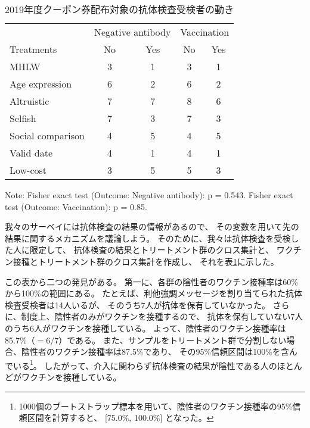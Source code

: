 \documentclass[
  11pt,
  a4paper,
]{article}
\begin{document}
\begin{table}

\caption{\label{tab:show-tester-coupon1}2019年度クーポン券配布対象の抗体検査受検者の動き}
\centering
\begin{threeparttable}
\begin{tabular}[t]{lcccc}
\toprule
\multicolumn{1}{c}{ } & \multicolumn{2}{c}{Negative antibody} & \multicolumn{2}{c}{Vaccination} \\
\cmidrule(l{3pt}r{3pt}){2-3} \cmidrule(l{3pt}r{3pt}){4-5}
Treatments & No & Yes & No  & Yes \\
\midrule
MHLW & 3 & 1 & 3 & 1\\
Age expression & 6 & 2 & 6 & 2\\
Altruistic & 7 & 7 & 8 & 6\\
Selfish & 7 & 3 & 7 & 3\\
Social comparison & 4 & 5 & 4 & 5\\
Valid date & 4 & 1 & 4 & 1\\
Low-cost & 3 & 5 & 5 & 3\\
\bottomrule
\end{tabular}
\begin{tablenotes}
\item Note: Fisher exact test (Outcome: Negative antibody): p = 0.543. Fisher exact test (Outcome: Vaccination): p = 0.85.
\end{tablenotes}
\end{threeparttable}
\end{table}

我々のサーベイには抗体検査の結果の情報があるので、
その変数を用いて先の結果に関するメカニズムを議論しよう。
そのために、我々は抗体検査を受検した人に限定して、
抗体検査の結果とトリートメント群のクロス集計と、
ワクチン接種とトリートメント群のクロス集計を作成し、
それを表\ref{tab:show-tester-coupon1}に示した。

この表から二つの発見がある。
第一に、各群の陰性者のワクチン接種率は60\%から100\%の範囲にある。
たとえば、利他強調メッセージを割り当てられた抗体検査受検者は14人いるが、
そのうち7人が抗体を保有していなかった。
さらに、制度上、陰性者のみがワクチンを接種するので、
抗体を保有していない7人のうち6人がワクチンを接種している。
よって、陰性者のワクチン接種率は85.7\%（\(=6/7\)）である。
また、サンプルをトリートメント群で分割しない場合、陰性者のワクチン接種率は87.5\%であり、
その95\%信頼区間は100\%を含んでいる\footnote{1000個のブートストラップ標本を用いて、陰性者のワクチン接種率の95\%信頼区間を計算すると、
  {[}75.0\%, 100.0\%{]}
  となった。}。
したがって、介入に関わらず抗体検査の結果が陰性である人のほとんどがワクチンを接種している。
\end{document}

